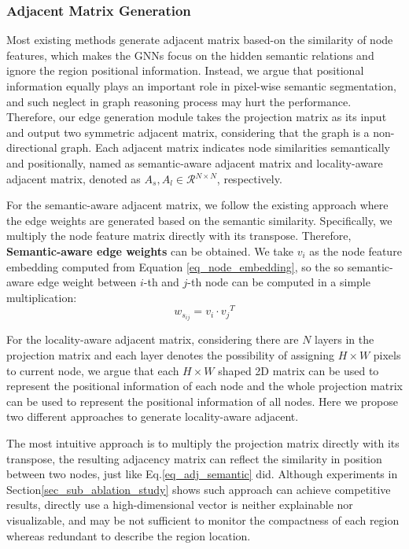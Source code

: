 ﻿\documentclass[journal]{IEEEtran}
\begin{document}
\subsubsection{Adjacent Matrix Generation}  \label{sec_sub_gen_edge} 
    Most existing methods generate adjacent matrix based-on the similarity of node features, which makes the GNNs focus on the hidden semantic relations and ignore the region positional information. Instead, we argue that positional information equally plays an important role in pixel-wise semantic segmentation, and such neglect in graph reasoning process may hurt the performance. Therefore, our edge generation module takes the projection matrix as its input and output two symmetric adjacent matrix, considering that the graph is a non-directional graph. Each adjacent matrix indicates node similarities semantically and positionally, named as semantic-aware adjacent matrix and locality-aware adjacent matrix, denoted as $A_s, A_l \in \mathcal{R}{^{N \times N}}$, respectively. 

    For the semantic-aware adjacent matrix, we follow the existing approach where the edge weights are generated based on the semantic similarity. Specifically, we multiply the node feature matrix directly with its transpose. Therefore, \textbf{Semantic-aware edge weights} can be obtained. We take $v_i$ as the node feature embedding computed from Equation \ref{eq_node_embedding}, so the so semantic-aware edge weight between $i$-th and $j$-th node can be computed in a simple multiplication:
    \begin{equation}\label{eq_adj_semantic}
        w_{s_{ij}} = v_i \cdot {v_j}^T
    \end{equation}
    
    For the locality-aware adjacent matrix, considering there are $N$ layers in the projection matrix and each layer denotes the possibility of assigning $H \times W$ pixels to current node, we argue that each $H \times W$ shaped 2D matrix can be used to represent the positional information of each node and the whole projection matrix can be used to represent the positional information of all nodes. Here we propose two different approaches to generate locality-aware adjacent. 
    
    The most intuitive approach is to multiply the projection matrix directly with its transpose, the resulting adjacency matrix can reflect the similarity in position between two nodes, just like Eq.\ref{eq_adj_semantic} did. Although experiments in Section\ref{sec_sub_ablation_study} shows such approach can achieve competitive results, directly use a high-dimensional vector is neither explainable nor visualizable, and may be not sufficient to monitor the compactness of each region whereas redundant to describe the region location.
    
\end{document}

